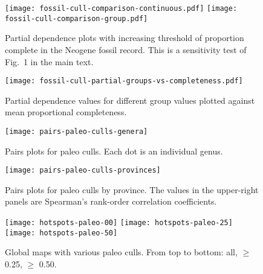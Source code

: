 \documentclass[11pt]{article}
\begin{document}
\clearpage

\begin{figure}[htbp]
\begin{center}
\texttt{[image: fossil-cull-comparison-continuous.pdf]}
\texttt{[image: fossil-cull-comparison-group.pdf]}
\caption{Partial dependence plots with increasing threshold of proportion complete in the Neogene fossil record. This is a sensitivity test of Fig.~1 in the main text.}
\label{fig:partial-paleo-culls}
\end{center}
\end{figure}

\clearpage

\begin{figure}[htbp]
\begin{center}
\texttt{[image: fossil-cull-partial-groups-vs-completeness.pdf]}
\caption{Partial dependence values for different group values plotted against mean proportional completeness.}
\label{fig:ext-prop-compl-scatter}
\end{center}
\end{figure}

\clearpage

\begin{figure}[htbp]
\begin{center}
\texttt{[image: pairs-paleo-culls-genera]}
\caption{Pairs plots for paleo culls. Each dot is an individual genus.}
\label{fig:pairs-genus-paleo-culls}
\end{center}
\end{figure}

\clearpage

\begin{figure}[htbp]
\begin{center}
\texttt{[image: pairs-paleo-culls-provinces]}
\caption{Pairs plots for paleo culls by province. The values in the upper-right panels are Spearman's rank-order correlation coefficients.}
\label{fig:pairs-prov-paleo-culls}
\end{center}
\end{figure}

\clearpage


\begin{figure}[htbp]
\begin{center}
\texttt{[image: hotspots-paleo-00]}
\texttt{[image: hotspots-paleo-25]}
\texttt{[image: hotspots-paleo-50]}
\caption{Global maps with various paleo culls. From top to bottom: all, $\ge$ 0.25, $\ge$ 0.50.}
\label{fig:overall-maps-paleo-culls}
\end{center}
\end{figure}
\end{document}
